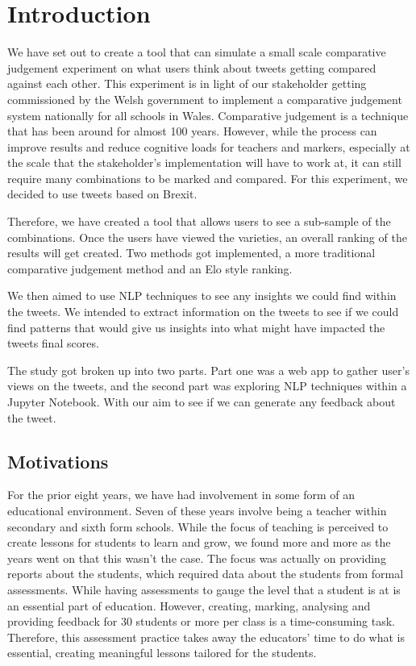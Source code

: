 \chapter{Introduction}
	\label{chap:intro}
	We have set out to create a tool that can simulate a small scale comparative judgement experiment on what users think about tweets getting compared against each other. This experiment is in light of our stakeholder getting commissioned by the Welsh government to implement a comparative judgement system nationally for all schools in Wales. Comparative judgement is a technique that has been around for almost 100 years. However, while the process can improve results and reduce cognitive loads for teachers and markers, especially at the scale that the stakeholder's implementation will have to work at, it can still require many combinations to be marked and compared. For this experiment, we decided to use tweets based on Brexit.
	
	Therefore, we have created a tool that allows users to see a sub-sample of the combinations. Once the users have viewed the varieties, an overall ranking of the results will get created. Two methods got implemented, a more traditional comparative judgement method and an Elo style ranking.
	
	We then aimed to use NLP techniques to see any insights we could find within the tweets. We intended to extract information on the tweets to see if we could find patterns that would give us insights into what might have impacted the tweets final scores.
	
	The study got broken up into two parts. Part one was a web app to gather user's views on the tweets, and the second part was exploring NLP techniques within a Jupyter Notebook. With our aim to see if we can generate any feedback about the tweet.


	\section{Motivations}
		\label{sec:intro_motivation} 
	For the prior eight years, we have had involvement in some form of an educational environment. Seven of these years involve being a teacher within secondary and sixth form schools. While the focus of teaching is perceived to create lessons for students to learn and grow, we found more and more as the years went on that this wasn't the case. The focus was actually on providing reports about the students, which required data about the students from formal assessments. While having assessments to gauge the level that a student is at is an essential part of education. However, creating, marking, analysing and providing feedback for 30 students or more per class is a time-consuming task. Therefore, this assessment practice takes away the educators' time to do what is essential, creating meaningful lessons tailored for the students.
	
